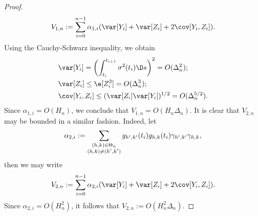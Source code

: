 \begin{appendices}
\begin{proof}
\begin{align}
  V_{1,n} := \sum_{i = 0}^{n-1} \alpha_{1,i} (\var[Y_i] + \var[Z_i] + 2 \cov[Y_i,Z_i]). \notag
  \label{}
\end{align}
Using the Cauchy-Schwarz inequality, we obtain 
\begin{align}
    &\var[Y_i] = \left(\int^{t_{i+1}}_{t_i} \sigma^2(t_i) \D s\right)^2 = O(\Delta_n^2);\\
    &\var[Z_i] \le \e[Z_i^2] = O(\Delta_n^3); \\
    &\cov[Y_i, Z_i] \le (\var[Z_i] \var[Y_i])^{1/2} = O(\Delta_n^{5/2}).
\end{align}
Since $\alpha_{1,i} = O(H_n)$, we conclude that  $V_{1,n} = O(H_n\Delta_n)$. It is clear that $V_{2,n}$ may be bounded in a similar fashion. Indeed, let
\begin{align}
  \alpha_{2,i} := \sum_{\substack{(h,k) \in \Theta_n\\ (h,k) \ne (h',k')}} g_{h',k'}(t_i)g_{h,k}(t_i)\gamma_{h',k'}\gamma_{h,k},\notag
  \label{}
\end{align}
then we may write
\begin{align}
  V_{2,n} := \sum_{i = 0}^{n-1} \alpha_{2,i} (\var[Y_i] + \var[Z_i] + 2 \cov[Y_i,Z_i]). \notag
  \label{}
\end{align}
Since $ \alpha_{2,i} = O(H_n^2)$, it follows that $V_{2,n} := O(H^2_n\Delta_n)$. 
\end{proof}
\end{appendices}
